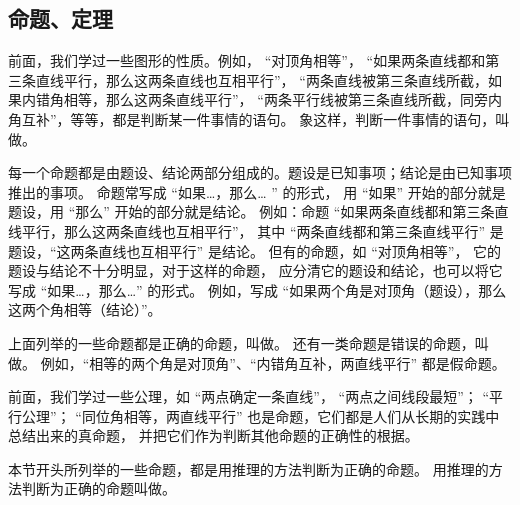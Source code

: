 \subsection{命题、定理}\label{subsec:czjh1-2-8}

前面，我们学过一些图形的性质。例如， “对顶角相等”，
“如果两条直线都和第三条直线平行，那么这两条直线也互相平行”，
“两条直线被第三条直线所截，如果内错角相等，那么这两条直线平行”，
“两条平行线被第三条直线所截，同旁内角互补”，等等，都是判断某一件事情的语句。
象这样，判断一件事情的语句，叫做。

每一个命题都是由题设、结论两部分组成的。题设是已知事项；结论是由已知事项推出的事项。
命题常写成 “如果…，那么… ” 的形式， 用 “如果” 开始的部分就是题设，用 “那么” 开始的部分就是结论。
例如：命题 “如果两条直线都和第三条直线平行，那么这两条直线也互相平行”，
其中 “两条直线都和第三条直线平行” 是题设，“这两条直线也互相平行” 是结论。
但有的命题，如 “对顶角相等”， 它的题设与结论不十分明显，对于这样的命题，
应分清它的题设和结论，也可以将它写成 “如果…，那么…” 的形式。
例如，写成 “如果两个角是对顶角（题设），那么这两个角相等（结论）”。

上面列举的一些命题都是正确的命题，叫做。
还有一类命题是错误的命题，叫做。
例如，“相等的两个角是对顶角”、“内错角互补，两直线平行” 都是假命题。

前面，我们学过一些公理，如 “两点确定一条直线”， “两点之间线段最短”；
“平行公理”； “同位角相等，两直线平行” 也是命题，它们都是人们从长期的实践中总结出来的真命题，
并把它们作为判断其他命题的正确性的根据。

本节开头所列举的一些命题，都是用推理的方法判断为正确的命题。
用推理的方法判断为正确的命题叫做。


